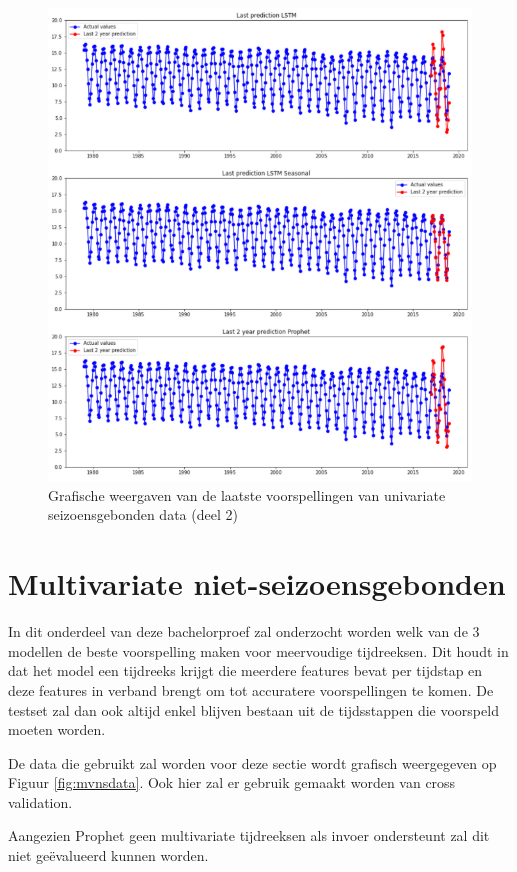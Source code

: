 \begin{figure}
    \centering
    \caption{Grafische weergaven van de laatste voorspellingen van univariate seizoensgebonden data (deel 2)}
    \label{fig:uvsgraph2}
    \includegraphics[width=1\linewidth]{uv_s_graph2}
\end{figure}


\section{Multivariate niet-seizoensgebonden}
In dit onderdeel van deze bachelorproef zal onderzocht worden welk van de 3 modellen de beste voorspelling maken voor meervoudige tijdreeksen. Dit houdt in dat het model een tijdreeks krijgt die meerdere features bevat per tijdstap en deze features in verband brengt om tot accuratere voorspellingen te komen. De testset zal dan ook altijd enkel blijven bestaan uit de tijdsstappen die voorspeld moeten worden.

De data die gebruikt zal worden voor deze sectie wordt grafisch weergegeven op Figuur \ref{fig:mvnsdata}. Ook hier zal er gebruik gemaakt worden van cross validation.

Aangezien Prophet geen multivariate tijdreeksen als invoer ondersteunt zal dit niet ge\"{e}valueerd kunnen worden.

